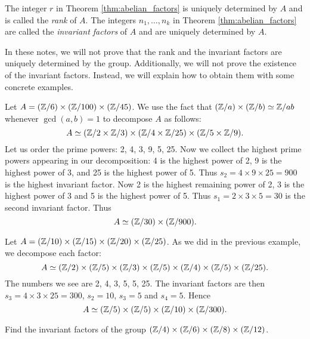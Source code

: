 The integer $r$ 
in Theorem \ref{thm:abelian_factors}
is uniquely determined by $A$ and 
is called the \emph{rank} of $A$. The integers $n_1,\dots,n_k$ 
in Theorem \ref{thm:abelian_factors}
are called the \emph{invariant factors} of $A$ and 
are uniquely determined by $A$. 

In these notes, we will not prove that the rank and the invariant factors are uniquely determined by the group. Additionally, we will not prove the existence 
of the invariant factors. Instead, we will explain how to obtain them with some concrete examples.

\begin{example}
    Let $A=(\mathbb{Z}/6)\times(\mathbb{Z}/100)\times(\mathbb{Z}/45)$. We use 
    the fact that $(\mathbb{Z}/a)\times(\mathbb{Z}/b)\simeq\mathbb{Z}/ab$ whenever $\gcd(a,b)=1$
    to decompose $A$ as follows:
    \[
    A\simeq (\mathbb{Z}/2\times\mathbb{Z}/3)\times(\mathbb{Z}/4\times\mathbb{Z}/25)\times(\mathbb{Z}/5\times\mathbb{Z}/9).
    \]
    Let us order the prime powers: 2, 4, 3, 9, 5, 25. 
    Now we collect the highest prime powers appearing in our decomposition: 4 is the highest power of 2,
    9 is the highest power of 3, and 25 is the highest power of 5. Thus 
    $s_2=4\times 9\times 25=900$ is the highest invariant factor. Now 
    2 is the highest remaining power of 2, 
    3 is the highest power of 3 and 5 is the highest power of 5. Thus 
    $s_1=2\times 3\times 5=30$ is the second invariant factor. 
    Thus 
    \[ 
    A\simeq (\mathbb{Z}/30)\times(\mathbb{Z}/900).
    \]
\end{example}

\begin{example}
    Let $A=(\mathbb{Z}/10)\times(\mathbb{Z}/15)\times(\mathbb{Z}/20)\times(\mathbb{Z}/25)$. 
    As we did in the previous example, we decompose each factor: 
    \[ 
    A\simeq (\mathbb{Z}/2)\times(\mathbb{Z}/5)\times(\mathbb{Z}/3)\times (\mathbb{Z}/5)\times(\mathbb{Z}/4)\times (\mathbb{Z}/5)\times(\mathbb{Z}/25). 
    \]
    The numbers we see are 2, 4, 3, 5, 5, 25. The invariant factors are
    then $s_3=4\times 3\times 25=300$, $s_2=10$, $s_3=5$ and $s_4=5$. 
    Hence 
    \[ 
    A\simeq (\mathbb{Z}/5)\times(\mathbb{Z}/5)\times(\mathbb{Z}/10)\times(\mathbb{Z}/300).
    \]
\end{example}

\begin{exercise}
\label{xca:factors:24,12,4,2}
    Find the invariant factors 
    of the group $(\mathbb{Z}/4)\times(\mathbb{Z}/6)\times(\mathbb{Z}/8)\times(\mathbb{Z}/12)$. 
\end{exercise}




    


